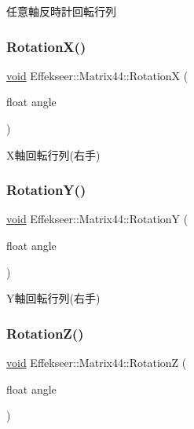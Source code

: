 任意軸反時計回転行列 

\mbox{\label{struct_effekseer_1_1_matrix44_a79af751b490a7107a767d85f87d9faf7}} 
\subsubsection{\texorpdfstring{Rotation\+X()}{RotationX()}}
{\footnotesize\ttfamily \mbox{\hyperlink{namespace_effekseer_ab34c4088e512200cf4c2716f168deb56}{void}} Effekseer\+::\+Matrix44\+::\+RotationX (\begin{DoxyParamCaption}\item[{float}]{angle }\end{DoxyParamCaption})}



X軸回転行列(右手) 

\mbox{\label{struct_effekseer_1_1_matrix44_a0c8f82d6551b691579d53278164806da}} 
\subsubsection{\texorpdfstring{Rotation\+Y()}{RotationY()}}
{\footnotesize\ttfamily \mbox{\hyperlink{namespace_effekseer_ab34c4088e512200cf4c2716f168deb56}{void}} Effekseer\+::\+Matrix44\+::\+RotationY (\begin{DoxyParamCaption}\item[{float}]{angle }\end{DoxyParamCaption})}



Y軸回転行列(右手) 

\mbox{\label{struct_effekseer_1_1_matrix44_a07b2387e64cdcf9227ca954a48d60e9f}} 
\subsubsection{\texorpdfstring{Rotation\+Z()}{RotationZ()}}
{\footnotesize\ttfamily \mbox{\hyperlink{namespace_effekseer_ab34c4088e512200cf4c2716f168deb56}{void}} Effekseer\+::\+Matrix44\+::\+RotationZ (\begin{DoxyParamCaption}\item[{float}]{angle }\end{DoxyParamCaption})}



